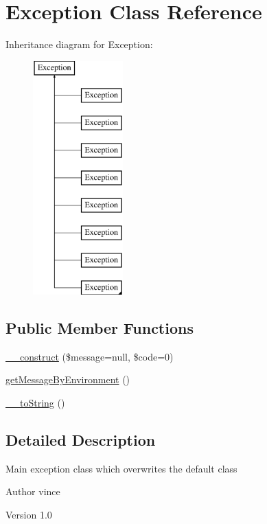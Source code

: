 \hypertarget{class_anemo_1_1_exception}{
\section{Exception Class Reference}
\label{class_anemo_1_1_exception}
}
Inheritance diagram for Exception:\begin{figure}[H]
\begin{center}
\leavevmode
\includegraphics[height=9.000000cm]{class_anemo_1_1_exception}
\end{center}
\end{figure}
\subsection*{Public Member Functions}
\begin{DoxyCompactItemize}
\item 
\hyperlink{class_anemo_1_1_exception_abc7ce908eb97fdb617867c6e9a12308f}{\_\-\_\-construct} (\$message=null, \$code=0)
\item 
\hyperlink{class_anemo_1_1_exception_a77284aff084aefd75c72496be43d6e4d}{getMessageByEnvironment} ()
\item 
\hyperlink{class_anemo_1_1_exception_a7516ca30af0db3cdbf9a7739b48ce91d}{\_\-\_\-toString} ()
\end{DoxyCompactItemize}


\subsection{Detailed Description}
Main exception class which overwrites the default class \begin{DoxyAuthor}{Author}
vince 
\end{DoxyAuthor}
\begin{DoxyVersion}{Version}
1.0 
\end{DoxyVersion}



